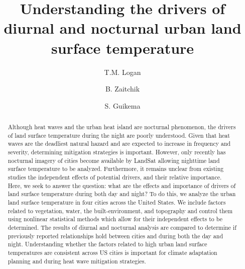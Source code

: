 \documentclass[]{elsarticle}
\begin{document}
\begin{frontmatter}

\title{Understanding the drivers of diurnal and nocturnal urban land surface temperature}

\author[1]{T.M. Logan}

\author[2]{B. Zaitchik}
\author[1]{S. Guikema}


\address[1]{Industrial and Operations Engineering, University of Michigan, Ann Arbor, MI}
\address[2]{Earth and Planetary Sciences, Johns Hopkins University, Baltimore, MD}

\begin{abstract}
Although heat waves and the urban heat island are nocturnal phenomenon, the drivers of land surface temperature during the night are poorly understood.
Given that heat waves are the deadliest natural hazard and are expected to increase in frequency and severity, determining mitigation strategies is important.
However, only recently has nocturnal imagery of cities become available by LandSat allowing nighttime land surface temperature to be analyzed.
Furthermore, it remains unclear from existing studies the independent effects of potential drivers, and their relative importance.
Here, we seek to answer the question: what are the effects and importance of drivers of land surface temperature during both day and night?
To do this, we analyze the urban land surface temperature in four cities across the United States.
We include factors related to vegetation, water, the built-environment, and topography and control them using nonlinear statistical methods which allow for their independent effects to be determined.
The results of diurnal and nocturnal analysis are compared to determine if previously reported relationships hold between cities and during both the day and night.
Understanding whether the factors related to high urban land surface temperatures are consistent across US cities is important for climate adaptation planning and during heat wave mitigation strategies.
\end{abstract}

\begin{keyword}

\end{keyword}

\end{frontmatter}
\end{document}
